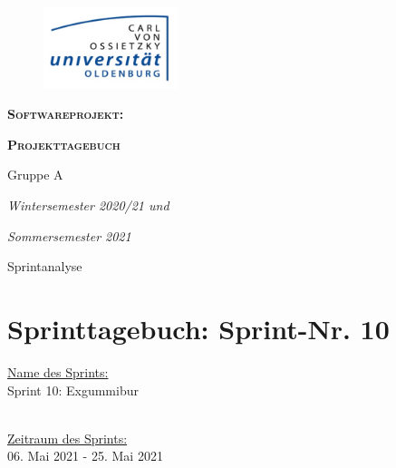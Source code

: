 \documentclass[12pt,a4paper, oneside]{article}
\author{Uni Oldenburg, SWP2020 Gruppe A}
\begin{document}
    \begin{titlepage}
        \pagestyle{empty}
        \begin{center}

            \begin{figure}[h]
                \centering
                \includegraphics[width=0.35\textwidth]{../img/Logo.jpg}
            \end{figure}

            \bigskip \bigskip \noindent
            \textsc{\textbf{\LARGE Softwareprojekt:}} \par \bigskip \noindent
            \textsc{\textbf{\LARGE Projekttagebuch}}

            \par \bigskip \bigskip \bigskip \bigskip \bigskip \noindent
            {\Large Gruppe A} \par \medskip \noindent

            \par \bigskip \bigskip \bigskip \bigskip \bigskip \bigskip \noindent
            \textit{\Large Wintersemester 2020/21 und} \par \noindent
            \textit{\Large Sommersemester 2021}

            \par \bigskip \bigskip \bigskip \bigskip \bigskip \bigskip \noindent
            \par \bigskip \bigskip \bigskip \noindent
            {\Large Sprintanalyse} \par \medskip \noindent

        \end{center}
    \end{titlepage}

    \tableofcontents
    \pagebreak

    \section{Sprinttagebuch: Sprint-Nr. 10}
    \underline{Name des Sprints:}
    \\
    Sprint 10: Exgummibur

    \noindent
    \\
    \underline{Zeitraum des Sprints:}
    \\
    06. Mai 2021 - 25. Mai 2021
\end{document}
